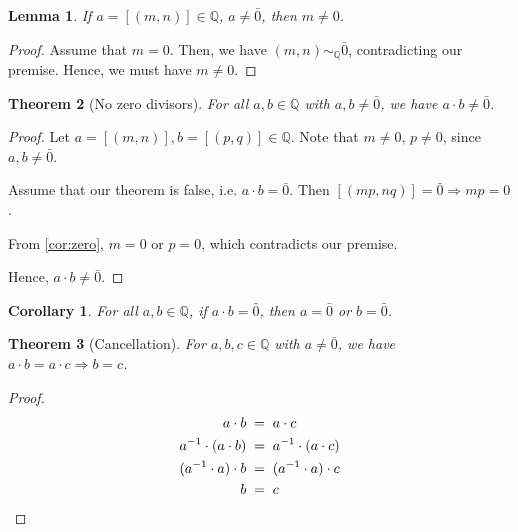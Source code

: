 \documentclass[10pt]{article}
\newtheorem{theorem}{Theorem}[section]
\newtheorem{lemma}[theorem]{Lemma}
\newtheorem{corollary}{Corollary}[theorem]
\theoremstyle{definition}
\theoremstyle{remark}
\newcommand{\Q}{\mathbb{Q}}
\newcommand{\simQ}{\sim_{\Q}}
\begin{document}
        \begin{lemma}
                If $a = [(m, n)] \in \Q$, $a \neq \bar{0}$, then $m \neq 0$.
        \end{lemma}
        \begin{proof}
                Assume that $m = 0$. Then, we have $(m, n) \simQ \bar{0}$,
                contradicting our premise. Hence, we must have $m\neq 0$.
        \end{proof}
        \begin{theorem}[No zero divisors]
                For all $a, b \in \Q$ with $a,b \neq \bar{0}$, we have $a\cdot b \neq \bar{0}$.
        \end{theorem}
        \begin{proof}
                Let $a = [(m, n)], b = [(p, q)] \in \Q$.
                Note that $m\neq 0$, $p\neq 0$, since $a, b \neq \bar{0}$.

                Assume that our theorem is false, i.e. $a\cdot b = \bar{0}$.
                Then $[(mp, nq)] = \bar{0} \Rightarrow mp = 0$.
                
                From \ref{cor:zero}, $m = 0$ or $p = 0$, which contradicts our premise.

                Hence, $a\cdot b \neq \bar{0}$.
        \end{proof}
        \begin{corollary}
        \label{cor:zeroQ}
                For all $a, b \in \Q$, if $a\cdot b = \bar{0}$, then $a = \bar{0}$ or 
                $b = \bar{0}$.
        \end{corollary}

        \begin{theorem}[Cancellation]
                For $a, b, c \in \Q$ with $a\neq \bar{0}$, we have $a\cdot b = a\cdot c
                \Rightarrow b = c$.
        \end{theorem}
        \begin{proof}
                \begin{align*}
                        a\cdot b \;&=\; a\cdot c\\
                        a^{-1}\cdot (a\cdot b) \;&=\; a^{-1}\cdot (a\cdot c) \\
                        (a^{-1}\cdot a)\cdot b \;&=\; (a^{-1}\cdot a)\cdot c\\
                        b \;&=\; c \qedhere
                \end{align*}
        \end{proof}
        
\end{document}
